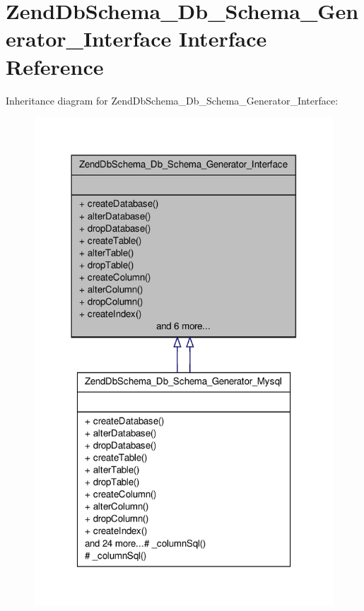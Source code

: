 \hypertarget{interfaceZendDbSchema__Db__Schema__Generator__Interface}{\section{\-Zend\-Db\-Schema\-\_\-\-Db\-\_\-\-Schema\-\_\-\-Generator\-\_\-\-Interface \-Interface \-Reference}
\label{interfaceZendDbSchema__Db__Schema__Generator__Interface}
}


\-Inheritance diagram for \-Zend\-Db\-Schema\-\_\-\-Db\-\_\-\-Schema\-\_\-\-Generator\-\_\-\-Interface\-:\nopagebreak
\begin{figure}[H]
\begin{center}
\leavevmode
\includegraphics[width=318pt]{interfaceZendDbSchema__Db__Schema__Generator__Interface__inherit__graph}
\end{center}
\end{figure}
